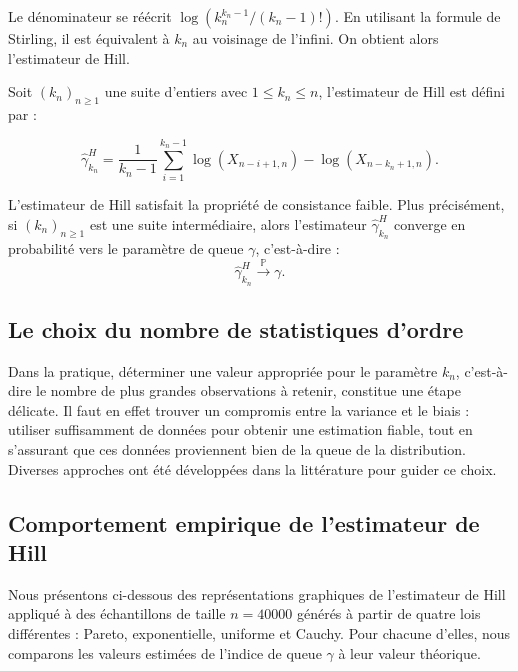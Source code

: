 \documentclass{article}
\begin{document}
Le dénominateur se réécrit $\log(k_n^{k_n - 1}/(k_n - 1)!)$. En utilisant la formule de Stirling, il est équivalent à $k_n$ au voisinage de l’infini. On obtient alors l’estimateur de Hill.

Soit $(k_n)_{n \geq 1}$ une suite d'entiers avec $1 \leq k_n \leq n$, l’estimateur de Hill est défini par :

\[
\hat{\gamma}^{H}_{k_n} = \frac{1}{k_n - 1} \sum_{i=1}^{k_n - 1} \log(X_{n - i + 1, n}) - \log(X_{n - k_n + 1, n}).
\]

L’estimateur de Hill satisfait la propriété de consistance faible. Plus précisément, si $(k_n)_{n \geq 1}$ est une suite intermédiaire, alors l’estimateur $\hat{\gamma}^{H}_{k_n}$ converge en probabilité vers le paramètre de queue $\gamma$, c’est-à-dire :
\[
\hat{\gamma}^{H}_{k_n} \xrightarrow{\mathbb{P}} \gamma.
\]


\subsection{Le choix du nombre de statistiques d’ordre}

Dans la pratique, déterminer une valeur appropriée pour le paramètre $k_n$, c’est-à-dire le nombre de plus grandes observations à retenir, constitue une étape délicate. Il faut en effet trouver un compromis entre la variance et le biais : utiliser suffisamment de données pour obtenir une estimation fiable, tout en s’assurant que ces données proviennent bien de la queue de la distribution. Diverses approches ont été développées dans la littérature pour guider ce choix.

\subsection{Comportement empirique de l’estimateur de Hill}

Nous présentons ci-dessous des représentations graphiques de l’estimateur de Hill appliqué à des échantillons de taille $n = 40000$ générés à partir de quatre lois différentes : Pareto, exponentielle, uniforme et Cauchy. Pour chacune d’elles, nous comparons les valeurs estimées de l’indice de queue $\gamma$ à leur valeur théorique.
\end{document}
